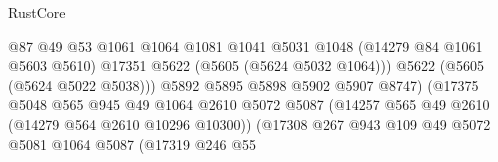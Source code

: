 \begin{lexlean}{RustCore}
\begin{coremodule}
                                                  @87
                                                  @49
                                                  @53
                                                  @1061
                                                  @1064
                                                  @1081
                                                  @1041
                                                  @5031
                                                  @1048
                                                  (@14279 @84 @1061 @5603 @5610)
                                                  @17351
                                                  @5622
                                                  (@5605 (@5624 @5032 @1064)))
                                                @5622
                                                (@5605 (@5624 @5022 @5038)))
                                              @5892
                                              @5895
                                              @5898
                                              @5902
                                              @5907
                                              @8747)
                                            (@17375
                                              @5048
                                              @565
                                              @945
                                              @49
                                              @1064
                                              @2610
                                              @5072
                                              @5087
                                              (@14257
                                                @565
                                                @49
                                                @2610
                                                (@14279 @564 @2610 @10296 @10300))
                                              (@17308
                                                @267
                                                @943
                                                @109
                                                @49
                                                @5072
                                                @5081
                                                @1064
                                                @5087
                                                (@17319
                                                  @246
                                                  @55

\end{coremodule}
\end{lexlean}

